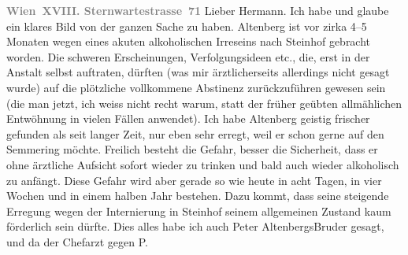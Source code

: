 \begin{ledgroupsized}[t]{13cm}
           \pstart
           \textcolor{gray}{\textbf{Wien XVIII. Sternwartestrasse 71}}\pend
           \pstart{}Lieber Hermann.\pend\pstart
           Ich habe \label{K_L02129-1v}\label{K_L02129-1h} und glaube ein klares Bild von der ganzen Sache zu haben. Altenberg ist vor zirka 4–5 Monaten wegen eines akuten
               alkoholischen Irreseins nach Steinhof gebracht
               worden. Die schweren Erscheinungen, Verfolgungsideen etc., die, erst in der Anstalt
               selbst auftraten, dürften (was mir ärztlicherseits allerdings nicht gesagt wurde) auf
               die plötzliche vollkommene Abstinenz zurückzuführen gewesen sein (die man jetzt, ich
               weiss nicht recht warum, statt der früher geübten allmählichen Entwöhnung in vielen
               Fällen anwendet). Ich habe Altenberg geistig
               frischer gefunden als seit langer Zeit, nur eben sehr erregt, weil er schon gerne auf
               den Semmering möchte. Freilich besteht die
               Gefahr, besser die Sicherheit, dass er ohne ärztliche Aufsicht sofort wieder zu
               trinken und bald auch wieder alkoholisch {\pb}zu \label{K_L02129-2v}\label{K_L02129-2h} anfängt. Diese Gefahr wird aber gerade so wie
               heute in acht Tagen, in vier Wochen und in einem halben Jahr bestehen. Dazu kommt,
               dass seine steigende Erregung wegen der Internierung in Steinhof seinem allgemeinen Zustand kaum förderlich sein dürfte.
               Dies alles habe ich auch Peter AltenbergsBruder gesagt, und da  der Chefarzt gegen P.

\end{ledgroupsized}
